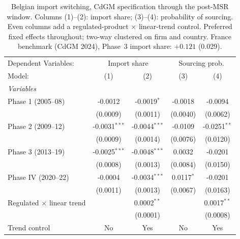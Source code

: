 
\begin{table}[htbp]
   \caption{\label{tab:cdgm_postmsr_nested} Belgian import switching, CdGM specification through the post-MSR window. Columns (1)--(2): import share; (3)--(4): probability of sourcing. Even columns add a regulated-product $\times$ linear-trend control. Preferred fixed effects throughout; two-way clustered on firm and country. France benchmark (CdGM 2024), Phase~3 import share: $+0.121$ (0.029).}
   \centering
   \begin{tabular}{lcccc}
      \tabularnewline \midrule \midrule
      Dependent Variables: & \multicolumn{2}{c}{Import share} & \multicolumn{2}{c}{Sourcing prob.}\\
      Model:                                   & (1)             & (2)             & (3)          & (4)\\  
      \midrule
      \emph{Variables}\\
      Phase 1 (2005--08)                       & -0.0012         & -0.0019$^{*}$   & -0.0018      & -0.0094\\   
                                               & (0.0009)        & (0.0011)        & (0.0040)     & (0.0062)\\   
      Phase 2 (2009--12)                       & -0.0031$^{***}$ & -0.0044$^{***}$ & -0.0109      & -0.0251$^{**}$\\   
                                               & (0.0009)        & (0.0014)        & (0.0076)     & (0.0120)\\   
      Phase 3 (2013--19)                       & -0.0025$^{***}$ & -0.0048$^{***}$ & 0.0032       & -0.0201\\   
                                               & (0.0008)        & (0.0013)        & (0.0084)     & (0.0150)\\   
      Phase IV (2020--22)                      & -0.0004         & -0.0034$^{***}$ & 0.0117$^{*}$ & -0.0201\\   
                                               & (0.0011)        & (0.0013)        & (0.0067)     & (0.0163)\\   
      Regulated $\times$ linear trend          &                 & 0.0002$^{**}$   &              & 0.0017$^{**}$\\   
                                               &                 & (0.0001)        &              & (0.0008)\\   
      Trend control                            & No              & Yes             & No           & Yes\\  

\end{tabular}
\end{table}
